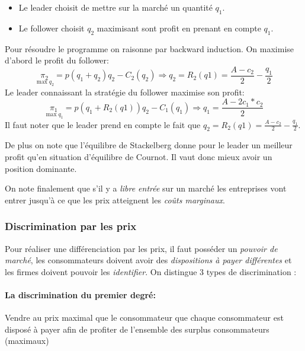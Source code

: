 \begin{tcolorbox}[title=Duopole de Stackelberg]
	
  \begin{itemize}[label=]
		\item Le leader choisit de mettre sur la marché un quantité $q_1$.
		\item Le follower choisit $q_2$ maximisant sont profit en prenant en compte $q_1$.
	\end{itemize}
	Pour résoudre le programme on raisonne par backward induction. On maximise d'abord le profit du follower:
	\[
		\underset{\max q_2}{\pi_2} = p(q_1+q_2)q_2-C_2(q_2) \Rightarrow q_2= R_2(q1)= \frac{A-c_2}{2}-\frac{q_1}{2}
	\]
	Le leader connaissant la stratégie du follower maximise son profit:
	\[
		\underset{\max q_1}{\pi_1} = p(q_1+R_2(q1))q_2-C_1(q_1) \Rightarrow q_1= \frac{A-2c_1*c_2}{2}
	\]
	Il faut noter que le leader prend en compte 
  le fait que $q_2= R_2(q1)= \frac{A-c_2}{2}-\frac{q_1}{2}$.
	
	De plus on note que l'équilibre de Stackelberg donne pour le 
  leader un meilleur profit qu'en situation d'équilibre de Cournot. 
  Il vaut donc mieux avoir un position dominante.
\end{tcolorbox}

On note finalement que s'il y a \emph{libre entrée} sur un marché 
les entreprises vont entrer jusqu'à ce que les prix atteignent les \emph{coûts marginaux}.

\subsubsection{Discrimination par les prix} %
\label{sub:discrimination_par_les_prix}
 Pour réaliser une différenciation par les prix, il faut posséder un \emph{pouvoir de marché},
 les consommateurs doivent avoir des \emph{dispositions à payer différentes} 
 et les firmes doivent pouvoir les \emph{identifier}. 
 On distingue 3 types de discrimination : 
 
 \paragraph{La discrimination du premier degré:} %
 \label{par:la_discrimination_du_premier_degre}
 Vendre au prix maximal que le consommateur que chaque consommateur est disposé 
 à payer afin de profiter de l'ensemble des surplus consommateurs (maximaux) 
 
 
